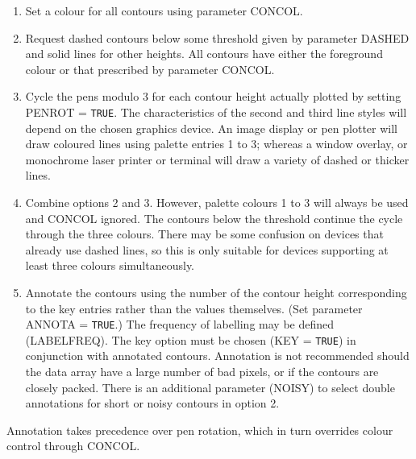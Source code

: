 \documentclass[twoside,11pt,nolof]{starlink}
\begin{document}
{{{         \begin{enumerate}
         \item Set a colour for all contours using parameter CONCOL.
         \item Request dashed contours below some threshold given by
               parameter DASHED and solid lines for other heights.  All
               contours have either the foreground colour or that
               prescribed by parameter CONCOL.
         \item Cycle the pens modulo 3 for each contour height actually
               plotted by setting PENROT = \texttt{TRUE}.  The characteristics of
               the second and third line styles will depend on the chosen
               graphics device.  An image display or pen plotter will draw
               coloured lines using palette entries 1 to 3; whereas a
               window overlay, or monochrome laser printer or terminal
               will draw a variety of dashed or thicker lines.
         \item Combine options 2 and 3.  However, palette colours 1 to 3
               will always be used and CONCOL ignored.  The contours below
               the threshold continue the cycle through the three colours.
               There may be some confusion on devices that already use
               dashed lines, so this is only suitable for devices
               supporting at least three colours simultaneously.
         \item Annotate the contours using the number of the contour height
               corresponding to the key entries rather than the values
               themselves.  (Set parameter ANNOTA = \texttt{TRUE}.)  The frequency
               of labelling may be defined (LABELFREQ).  The key option
               must be chosen (KEY = \texttt{TRUE}) in conjunction with annotated
               contours.  Annotation is not recommended should the data
               array have a large number of bad pixels, or if the contours
               are closely packed.  There is an additional parameter
               (NOISY) to select double annotations for short or noisy
               contours in option 2.
         \end{enumerate}

         Annotation takes precedence over pen rotation, which in turn
         overrides colour control through CONCOL.
      }
   }
}
\end{document}
